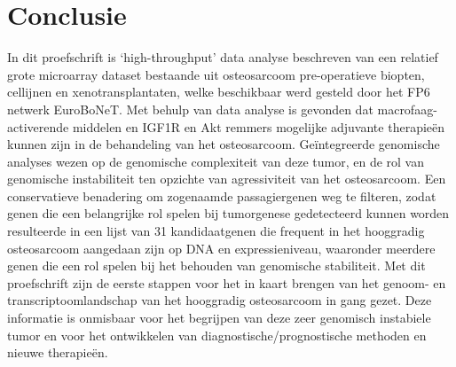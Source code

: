\section{Conclusie}\label{conclusie10}
In dit proefschrift is `high\hyp{}throughput' data analyse beschreven van een relatief grote microarray dataset bestaande uit osteosarcoom pre\hyp{}operatieve biopten, cellijnen en xenotransplantaten, welke beschikbaar werd gesteld door het FP6 netwerk EuroBoNeT. Met behulp van data analyse is gevonden dat macrofaag\hyp{}activerende middelen en IGF1R en Akt remmers mogelijke adjuvante therapie\"en kunnen zijn in de behandeling van het osteosarcoom. Ge\"integreerde genomische analyses wezen op de genomische complexiteit van deze tumor, en de rol van genomische instabiliteit ten opzichte van agressiviteit van het osteosarcoom. Een conservatieve benadering om zogenaamde passagiergenen weg te filteren, zodat genen die een belangrijke rol spelen bij tumorgenese gedetecteerd kunnen worden resulteerde in een lijst van 31 kandidaatgenen die frequent in het hooggradig osteosarcoom aangedaan zijn op DNA en expressieniveau, waaronder meerdere genen die een rol spelen bij het behouden van genomische stabiliteit. Met dit proefschrift zijn de eerste stappen voor het in kaart brengen van het genoom- en transcriptoomlandschap van het hooggradig osteosarcoom in gang gezet. Deze informatie is onmisbaar voor het begrijpen van deze zeer genomisch instabiele tumor en voor het ontwikkelen van diagnostische/prognostische methoden en nieuwe therapie\"en.
%
%
\makeatletter\@openrightfalse %
%
\newpage
\renewcommand{\chaptername}{}		%
\renewcommand{\thechapter}{}			%
